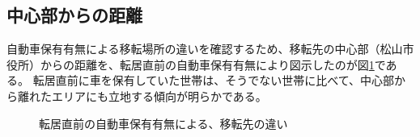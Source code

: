 \documentclass[a4paper,12pt, uplatex]{jsbook}
\begin{document}
\subsection{中心部からの距離}
自動車保有有無による移転場所の違いを確認するため、移転先の中心部（松山市役所）からの距離を、転居直前の自動車保有有無により図示したのが図\ref{fig:center_distance_car}である。
転居直前に車を保有していた世帯は、そうでない世帯に比べて、中心部から離れたエリアにも立地する傾向が明らかである。
%
\begin{figure}[H]
\centering
{}%
\caption{転居直前の自動車保有有無による、移転先の違い}
\label{fig:center_distance_car}
\end{figure}
\end{document}
